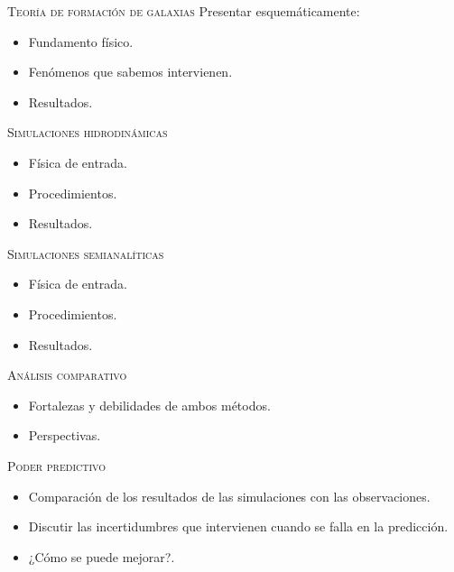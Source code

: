 \documentclass[xcolor=dvipsnames,4pt,hyperref={colorlinks,citecolor=black,linkcolor=black,urlcolor=black}]{beamer}
\begin{document}
\begin{frame}[allowframebreaks]{\textsc{Teoría de formación de galaxias}}
%
Presentar esquemáticamente:

\begin{itemize}
\item Fundamento físico.
\item Fenómenos que sabemos intervienen.
\item Resultados.
\end{itemize}
%
\end{frame}

%
\begin{frame}[allowframebreaks]{\textsc{Simulaciones hidrodinámicas}}
%
\begin{itemize}
\item Física de entrada.
\item Procedimientos.
\item Resultados.
\end{itemize}
%
\end{frame}

\begin{frame}[allowframebreaks]{\textsc{Simulaciones semianalíticas}}
%
\begin{itemize}
\item Física de entrada.
\item Procedimientos.
\item Resultados.
\end{itemize}
%
\end{frame}

\begin{frame}[allowframebreaks]{\textsc{Análisis comparativo}}
%
\begin{itemize}
\item Fortalezas y debilidades de ambos métodos.
\item Perspectivas.
\end{itemize}
%
\end{frame}

\begin{frame}[allowframebreaks]{\textsc{Poder predictivo}}
%
\begin{itemize}
\item Comparación de los resultados de las simulaciones con las observaciones.
\item Discutir las incertidumbres que intervienen cuando se falla en la predicción.
\item ¿Cómo se puede mejorar?.
\end{itemize}
%
\end{frame}
\end{document}
